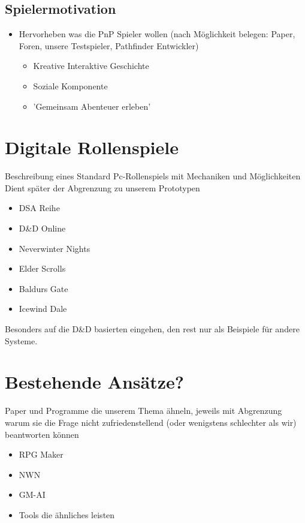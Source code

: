 \subsection{Spielermotivation}
\label{sec:Spielermotivation}

\begin{itemize}
	\item Hervorheben was die PnP Spieler wollen (nach Möglichkeit belegen: Paper, Foren, unsere Testspieler, Pathfinder Entwickler)
	
	\begin{itemize}
		\item Kreative Interaktive Geschichte
		\item Soziale Komponente
		\item 'Gemeinsam Abenteuer erleben'
	\end{itemize}
\end{itemize}


\section{Digitale Rollenspiele}
\label{sec:DigitaleRollenspiele}

Beschreibung eines Standard Pc-Rollenspiels mit Mechaniken und Möglichkeiten\newline
Dient später der Abgrenzung zu unserem Prototypen
\begin{itemize}
	\item DSA Reihe
	\item D\&D Online
	\item Neverwinter Nights
	\item Elder Scrolls
	\item Baldurs Gate
	\item Icewind Dale
\end{itemize}
Besonders auf die D\&D basierten eingehen, den rest nur als Beispiele für andere Systeme.

\section{Bestehende Ansätze?}
\label{sec:BekannteAnsaetze}
Paper und Programme die unserem Thema ähneln, jeweils mit Abgrenzung warum sie die Frage nicht zufriedenstellend (oder wenigstens schlechter als wir) beantworten können
\begin{itemize}
	\item RPG Maker
	\item NWN
	\item GM-AI
	\item Tools die ähnliches leisten
\end{itemize}